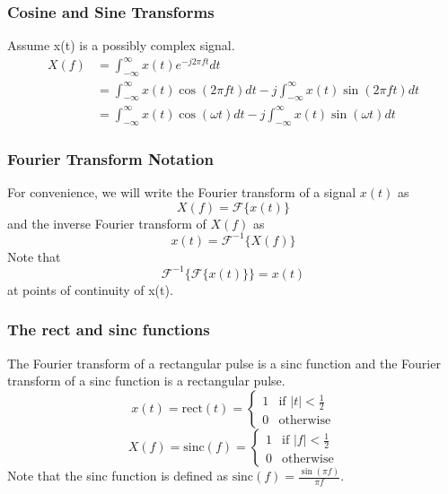 \documentclass{beamer}
\begin{document}
\begin{frame}
    \frametitle{Cosine and Sine Transforms}
    Assume x(t) is a possibly complex signal.
    \begin{equation*}
        \begin{split}
            X(f) &= \int_{-\infty}^{\infty} x(t) e^{-j2\pi ft} dt\\
            &= \int_{-\infty}^{\infty} x(t) \cos(2\pi ft) dt - j\int_{-\infty}^{\infty} x(t) \sin(2\pi ft) dt\\
            &= \int_{-\infty}^{\infty} x(t) \cos(\omega t) dt - j\int_{-\infty}^{\infty} x(t) \sin(\omega t) dt
        \end{split}
    \end{equation*}
\end{frame}

\begin{frame}
    \frametitle{Fourier Transform Notation}
    For convenience, we will write the Fourier transform of a signal $x(t)$ as
    \begin{equation*}
        X(f) = \mathcal{F}\{x(t)\}
    \end{equation*}
    and the inverse Fourier transform of $X(f)$ as
    \begin{equation*}
        x(t) = \mathcal{F}^{-1}\{X(f)\}
    \end{equation*}
    Note that
    \begin{equation*}
        \mathcal{F}^{-1}\{\mathcal{F}\{x(t)\}\} = x(t)
    \end{equation*}
    at points of continuity of x(t).
\end{frame}

\begin{frame}
    \frametitle{The rect and sinc functions}
    The Fourier transform of a rectangular pulse is a sinc function and the Fourier transform of a sinc function is a rectangular pulse.
    \begin{equation*}
        x(t) = \text{rect}(t) = \begin{cases}
            1 & \text{if } |t| < \frac{1}{2}\\
            0 & \text{otherwise}
        \end{cases}
    \end{equation*}
    \begin{equation*}
        X(f) = \text{sinc}(f) = \begin{cases}
            1 & \text{if } |f| < \frac{1}{2}\\
            0 & \text{otherwise}
        \end{cases}
    \end{equation*}
    Note that the sinc function is defined as $\text{sinc}(f) = \frac{\sin(\pi f)}{\pi f}$.
\end{frame}
\end{document}
